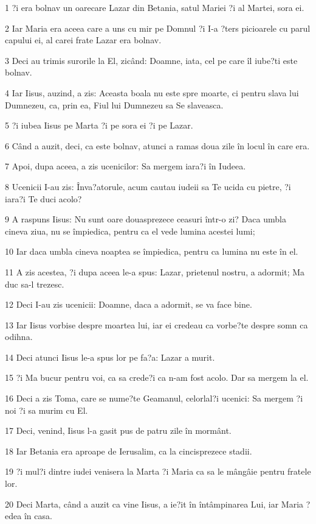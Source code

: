 \par 1 ?i era bolnav un oarecare Lazar din Betania, satul Mariei ?i al Martei, sora ei.
\par 2 Iar Maria era aceea care a uns cu mir pe Domnul ?i I-a ?ters picioarele cu parul capului ei, al carei frate Lazar era bolnav.
\par 3 Deci au trimis surorile la El, zicând: Doamne, iata, cel pe care îl iube?ti este bolnav.
\par 4 Iar Iisus, auzind, a zis: Aceasta boala nu este spre moarte, ci pentru slava lui Dumnezeu, ca, prin ea, Fiul lui Dumnezeu sa Se slaveasca.
\par 5 ?i iubea Iisus pe Marta ?i pe sora ei ?i pe Lazar.
\par 6 Când a auzit, deci, ca este bolnav, atunci a ramas doua zile în locul în care era.
\par 7 Apoi, dupa aceea, a zis ucenicilor: Sa mergem iara?i în Iudeea.
\par 8 Ucenicii I-au zis: Înva?atorule, acum cautau iudeii sa Te ucida cu pietre, ?i iara?i Te duci acolo?
\par 9 A raspuns Iisus: Nu sunt oare douasprezece ceasuri într-o zi? Daca umbla cineva ziua, nu se împiedica, pentru ca el vede lumina acestei lumi;
\par 10 Iar daca umbla cineva noaptea se împiedica, pentru ca lumina nu este în el.
\par 11 A zis acestea, ?i dupa aceea le-a spus: Lazar, prietenul nostru, a adormit; Ma duc sa-l trezesc.
\par 12 Deci I-au zis ucenicii: Doamne, daca a adormit, se va face bine.
\par 13 Iar Iisus vorbise despre moartea lui, iar ei credeau ca vorbe?te despre somn ca odihna.
\par 14 Deci atunci Iisus le-a spus lor pe fa?a: Lazar a murit.
\par 15 ?i Ma bucur pentru voi, ca sa crede?i ca n-am fost acolo. Dar sa mergem la el.
\par 16 Deci a zis Toma, care se nume?te Geamanul, celorlal?i ucenici: Sa mergem ?i noi ?i sa murim cu El.
\par 17 Deci, venind, Iisus l-a gasit pus de patru zile în mormânt.
\par 18 Iar Betania era aproape de Ierusalim, ca la cincisprezece stadii.
\par 19 ?i mul?i dintre iudei venisera la Marta ?i Maria ca sa le mângâie pentru fratele lor.
\par 20 Deci Marta, când a auzit ca vine Iisus, a ie?it în întâmpinarea Lui, iar Maria ?edea în casa.
